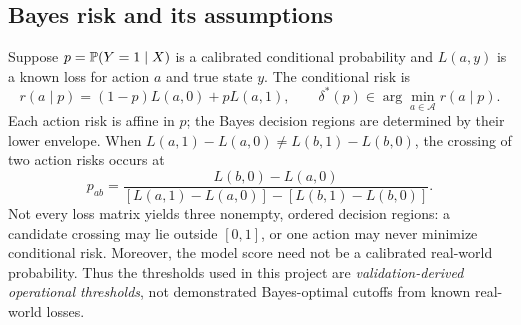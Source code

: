 \documentclass[11pt,a4paper]{article}
\begin{document}
\subsection{Bayes risk and its assumptions}
Suppose $p=\mathbb P(Y=1\mid X)$ is a calibrated conditional probability and $L(a,y)$ is a known loss for action $a$ and true state $y$. The conditional risk is
\begin{equation}r(a\mid p)=(1-p)L(a,0)+pL(a,1),\qquad \delta^*(p)\in\arg\min_{a\in\mathcal A}r(a\mid p).\end{equation}
Each action risk is affine in $p$; the Bayes decision regions are determined by their lower envelope. When $L(a,1)-L(a,0)\ne L(b,1)-L(b,0)$, the crossing of two action risks occurs at
\begin{equation}\label{eq:cross}
p_{ab}=\frac{L(b,0)-L(a,0)}{[L(a,1)-L(a,0)]-[L(b,1)-L(b,0)]}.
\end{equation}
Not every loss matrix yields three nonempty, ordered decision regions: a candidate crossing may lie outside $[0,1]$, or one action may never minimize conditional risk. Moreover, the model score need not be a calibrated real-world probability. Thus the thresholds used in this project are \emph{validation-derived operational thresholds}, not demonstrated Bayes-optimal cutoffs from known real-world losses.
\end{document}

